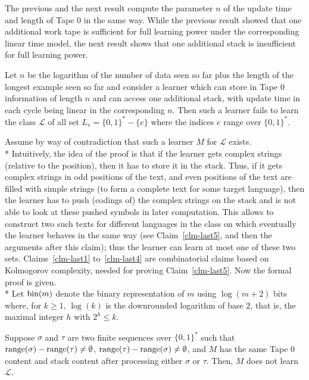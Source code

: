 \documentclass{LMCS}
\newcommand{\CalL}{{\mathcal L}}
\newcommand{\range}{{\rm range}}
\newcommand{\bin}{{\rm bin}}
\theoremstyle{plain}\newtheorem{athm}[thm]{Theorem}
\theoremstyle{plain}\newtheorem{aprop}[thm]{Proposition}
\theoremstyle{plain}\newtheorem{aprob}[thm]{Open Problem}
\theoremstyle{plain}\newtheorem{acor}[thm]{Corollary}
\theoremstyle{plain}\newtheorem{alem}[thm]{Lemma}
\theoremstyle{definition}\newtheorem{adefn}[thm]{Definition}
\theoremstyle{definition}\newtheorem{arem}[thm]{Remark}
\theoremstyle{plain}\newtheorem{aexmp}[thm]{Example}
\theoremstyle{plain}\newtheorem{aclm}[thm]{Claim}
\def\sp{\\*\indent}
\begin{document}
\noindent
The previous and the next result compute the parameter $n$
of the update time and length of Tape $0$ in the same way. While the previous
result showed that one additional work tape is sufficient for full
learning power
under the corresponding linear time model, the next result shows that one
additional stack is insufficient for full learning power.

\begin{thm}
Let $n$ be the logarithm of the number
of data seen so far plus the length of the longest example seen so far
and consider a learner which can store in Tape $0$ information of length $n$
and can access one additional stack, with
update time in each cycle being linear in the corresponding $n$.
Then such a learner fails to learn the class $\CalL$
of all set $L_e = \{0,1\}^*-\{e\}$ where the indices $e$
range over $\{0,1\}^*$.
\end{thm}

\proof
Assume by way of contradiction that such a learner $M$ for $\CalL$
exists. 
\sp
Intuitively, the idea of the proof is that if the learner gets
complex strings (relative to the position), 
then it has to store it in the stack. Thus, if it gets complex strings
in odd positions of the text, and even positions of the text
are filled with simple strings (to form a complete text for some 
target language), then
the learner has to push (codings of) the complex strings on the stack and 
is not able to look at these pushed symbols in later computation.
This allows to construct two such texts for different languages in
the class on which eventually the learner behaves in the same way
(see Claim~\ref{clm-last5}, and then the arguments after this claim);
thus the learner can learn at most one of these two sets.
Claims~\ref{clm-last1} to~\ref{clm-last4} are combinatorial claims 
based on Kolmogorov complexity, needed for proving Claim~\ref{clm-last5}.
Now the formal proof is given.
\sp
Let $\bin(m)$ denote the binary representation of $m$ using $\log(m+2)$ bits
where, for $k \geq 1$,  $\log(k)$ is the downrounded logarithm of base
$2$, that is, the
maximal integer $h$ with $2^h \leq k$.

\begin{clm}\label{clm-last1}
Suppose $\sigma$ and $\tau$ are two finite sequences over $\{0,1\}^*$ such that
$\range(\sigma)-\range(\tau) \neq \emptyset$,
$\range(\tau) - \range(\sigma) \neq \emptyset$,
and $M$ has the same Tape $0$ content and stack content 
after processing either $\sigma$ or $\tau$. Then, $M$ does not learn $\CalL$.
\end{clm}
\end{document}
